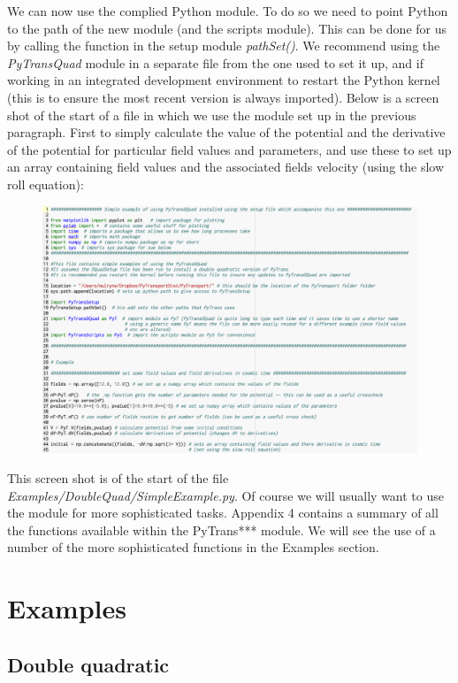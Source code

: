 \documentclass[10pt,
amsmath,amssymb,
aps,prd,nofootinbib,eqsecnum,a4paper]{revtex4}
\begin{document}
We can now use the complied Python module. To do so we need to point Python to the path of the new module (and 
the scripts module). This can be done for us by calling the function in the setup module {\it pathSet()}. We recommend using the {\it PyTransQuad} module in a separate file from the one used to set it up, and if working in an integrated development environment to restart the Python kernel (this is to ensure the most recent version is always imported). Below is a screen shot of the start of a file in which we use the module set up in the previous paragraph. First 
to simply calculate the value of the potential and the derivative of the potential for particular field values and parameters,
and use these to set up an array containing field values and the associated fields velocity (using the slow roll
equation):


\begin{figure}[H]
\centering
\includegraphics[width=18cm]{shot2}
\end{figure}

This screen shot is of the start of the file {\it Examples/DoubleQuad/SimpleExample.py}. Of course we will usually want 
to use the module for more sophisticated tasks. Appendix 4 contains a summary 
of all the functions  available within the { PyTrans***} module. We will see the use of a number of the more sophisticated functions in the 
Examples section.

\section{Examples}
\label{Examples}

\subsection{Double quadratic}
\end{document}
